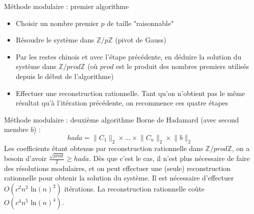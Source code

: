 \documentclass[11pt]{beamer}
\begin{document}
	\begin{frame}{Méthode modulaire : premier algorithme}
		\begin{itemize}
			\item Choisir un nombre premier $p$ de taille "raisonnable"
			\item Résoudre le système dans $\mathbb{Z}/p\mathbb{Z}$ (pivot de Gauss)
			\item Par les restes chinois et avec l'étape précédente, en déduire la solution du système dans $\mathbb{Z}/prod\mathbb{Z}$ (où $prod$ est le produit des nombres premiers utilisés depuis le début de l'algorithme)
			\item Effectuer une reconstruction rationnelle. Tant qu'on n'obtient pas le même résultat qu'à l'itération précédente, on recommence ces quatre étapes
		\end{itemize}
	\end{frame}
	
	\begin{frame}{Méthode modulaire : deuxième algorithme}
		Borne de Hadamard (avec second membre $b$) :
		$$ hada = \lVert C_1 \rVert_2 \times \hdots \times \lVert C_n \rVert_2 \times \lVert b \rVert_2$$
		Les coefficients étant obtenus par reconstruction rationnelle dans $\mathbb{Z}/prod\mathbb{Z}$, on a besoin d'avoir $\frac{\sqrt{prod}}{2} \geq hada $.
		Dès que c'est le cas, il n'est plus nécessaire de faire des résolutions modulaires, et on peut effectuer une (seule) reconstruction rationnelle pour obtenir la solution du système.
		\newline
		Il est nécessaire d'effectuer $O(c^2n^2 \mbox{ ln}(n)^2)$ itérations. 
		\newline
		La reconstruction rationnelle coûte $O(c^4n^5 \mbox{ ln}(n)^4)$.
	\end{frame}
	
\end{document}
